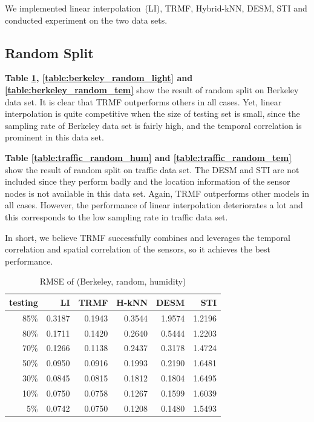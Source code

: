 We implemented linear interpolation~(LI), TRMF, Hybrid-kNN, DESM, STI and conducted experiment on the two data sets.

\subsection{Random Split}
\textbf{Table \ref{table:berkeley_random_hum}, \ref{table:berkeley_random_light} and \ref{table:berkeley_random_tem}} show the result of random split on Berkeley data set. It is clear that TRMF outperforms others in all cases. Yet, linear interpolation is quite competitive when the size of testing set is small, since the sampling rate of Berkeley data set is fairly high, and the temporal correlation is prominent in this data set.  

\textbf{Table \ref{table:traffic_random_hum} and \ref{table:traffic_random_tem}} show the result of random split on traffic data set. The DESM and STI are not included since they perform badly and the location information of the sensor nodes is not available in this data set. Again, TRMF outperforms other models in all cases. However, the performance of linear interpolation deteriorates a lot and this corresponds to the low sampling rate in traffic data set. 

In short, we believe TRMF successfully combines and leverages the temporal correlation and spatial correlation of the sensors, so it achieves the best performance. %

\begin{table}[htbp]
\centering
\caption{RMSE of (Berkeley, random, humidity)}
\label{table:berkeley_random_hum}
\begin{tabular}{ r | r r r r r}
	testing	&LI	&TRMF	&H-kNN	&DESM	&STI\\ \hline
	85\%	&0.3187	&0.1943	&0.3544	&1.9574	&1.2196\\ 
	80\%	&0.1711	&0.1420	&0.2640	&0.5444	&1.2203\\
	70\%	&0.1266	&0.1138	&0.2437	&0.3178	&1.4724\\
	50\%	&0.0950	&0.0916	&0.1993	&0.2190	&1.6481\\
	30\%	&0.0845	&0.0815	&0.1812	&0.1804	&1.6495\\
	10\%	&0.0750	&0.0758	&0.1267	&0.1599	&1.6039\\
	 5\%	&0.0742	&0.0750	&0.1208	&0.1480	&1.5493\\
\end{tabular}
\end{table}

